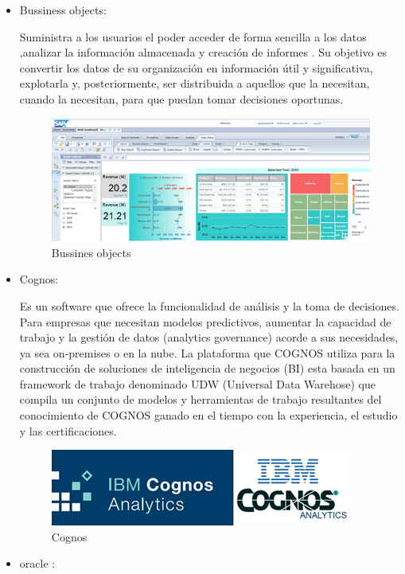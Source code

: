 \documentclass[twoside,twocolumn]{article}
\begin{document}
\begin{itemize}
\item Bussiness objects: 

Suministra a los usuarios el poder acceder de forma sencilla a los datos ,analizar la información almacenada y creación de informes .
Su objetivo es convertir los datos de su organización en información útil y significativa, explotarla y, posteriormente, ser distribuida a aquellos que la necesitan, cuando la necesitan, para que puedan tomar decisiones oportunas.


\begin{figure}[h!]
	\centering
	\includegraphics[scale=0.45]{Image/4.PNG}
	\caption{Bussines objects}
	\label{fig:Csha3}
\end{figure}


\item Cognos: 

Es un software que ofrece la funcionalidad de análisis y la toma de decisiones.
Para empresas que necesitan modelos predictivos, aumentar la capacidad de trabajo y la gestión de datos (analytics governance) acorde a sus necesidades, ya sea on-premises o en la nube. La plataforma que COGNOS utiliza para la construcción de soluciones de inteligencia de negocios (BI) esta basada en un framework de trabajo denominado UDW (Universal Data Warehose) que compila un conjunto de modelos y herramientas de trabajo resultantes del conocimiento de COGNOS ganado en el tiempo con la experiencia, el estudio y las certificaciones.


\begin{figure}[h!]
	\centering
	\includegraphics[scale=0.45]{Image/5.PNG}
	\caption{Cognos}
	\label{fig:Csha3}
\end{figure}

\item 	oracle :


\end{itemize}
\end{document}
